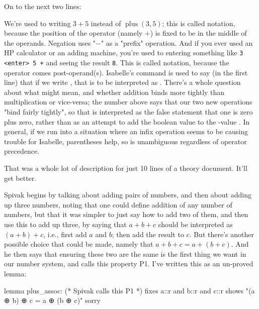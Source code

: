 On to the next two lines:

We're used to writing $3 + 5$ instead of $\operatorname{plus}(3, 5)$; this is called  notation, because the position of the operator (namely $+$) is fixed to be in the middle of the operands. Negation uses "$-$" as a "prefix" operation. And if you ever used an HP calculator or an adding machine, you're used to entering something like \verb!3 <enter> 5 +! and seeing the result \verb!8!. This is called  notation, because the operator comes post-operand(s). Isabelle's  command is used to say (in the first line) that if we write , that is to be interpreted as . There's a whole question about what 
 might mean, and whether addition binds more tightly than multiplication or vice-versa; the number   above says that our two new operations "bind fairly tightly", so that  is interpreted as the false statement that one is zero plus zero, rather than as an attempt to add the boolean value  to the -value . In general, if we run into a situation where an infix operation seems to be causing trouble for Isabelle, parentheses help, so  is unambiguous regardless of operator precedence. 

That was a whole lot of description for just 10 lines of a theory document. It'll get better. 

Spivak begins by talking about adding pairs of numbers, and then about adding up three numbers, noting that one could define addition of any number of numbers, but that it was simpler to just say how to add two of them, and then use this to add up three, by saying that $a + b + c$ should be interpreted as $(a + b) + c$, i.e., first add $a$ and $b$; then add the result to $c$. But there's another possible choice that could be made, namely that $a+b+c = a + (b+c)$. And he then says that ensuring these two are the same is the first thing we want in our number system, and calls this property P1. I've written this as an un-proved lemma: 
\begin{IS}
  lemma plus_assoc: (* Spivak calls this P1 *)
  fixes a::r and b::r and c::r
  shows "(a ⊕ b) ⊕ c =  a ⊕ (b ⊕ c)"
  sorry
\end{IS}

